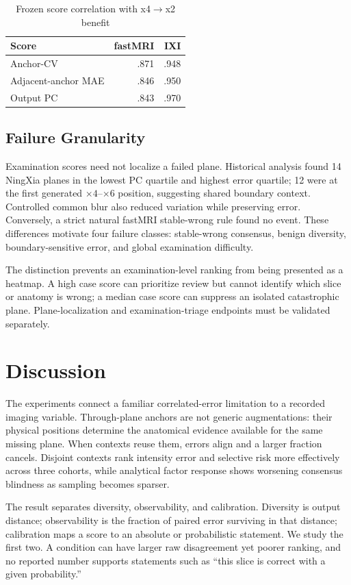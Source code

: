 \documentclass[journal,10pt]{IEEEtran}
\begin{document}
\begin{table}[t]
\caption{Frozen score correlation with x4$\rightarrow$x2 benefit}
\label{tab:benefit}\centering
\begin{tabular}{lrr}
\toprule
Score&fastMRI&IXI\\
\midrule
Anchor-CV&.871&.948\\
Adjacent-anchor MAE&.846&.950\\
Output PC&.843&.970\\
\bottomrule
\end{tabular}
\end{table}

\subsection{Failure Granularity}
Examination scores need not localize a failed plane. Historical analysis found 14 NingXia planes in the lowest PC quartile and highest error quartile; 12 were at the first generated $\times4$--$\times6$ position, suggesting shared boundary context. Controlled common blur also reduced variation while preserving error. Conversely, a strict natural fastMRI stable-wrong rule found no event. These differences motivate four failure classes: stable-wrong consensus, benign diversity, boundary-sensitive error, and global examination difficulty.

The distinction prevents an examination-level ranking from being presented as a heatmap. A high case score can prioritize review but cannot identify which slice or anatomy is wrong; a median case score can suppress an isolated catastrophic plane. Plane-localization and examination-triage endpoints must be validated separately.

\section{Discussion}
The experiments connect a familiar correlated-error limitation to a recorded imaging variable. Through-plane anchors are not generic augmentations: their physical positions determine the anatomical evidence available for the same missing plane. When contexts reuse them, errors align and a larger fraction cancels. Disjoint contexts rank intensity error and selective risk more effectively across three cohorts, while analytical factor response shows worsening consensus blindness as sampling becomes sparser.

The result separates diversity, observability, and calibration. Diversity is output distance; observability is the fraction of paired error surviving in that distance; calibration maps a score to an absolute or probabilistic statement. We study the first two. A condition can have larger raw disagreement yet poorer ranking, and no reported number supports statements such as ``this slice is correct with a given probability.''
\end{document}
